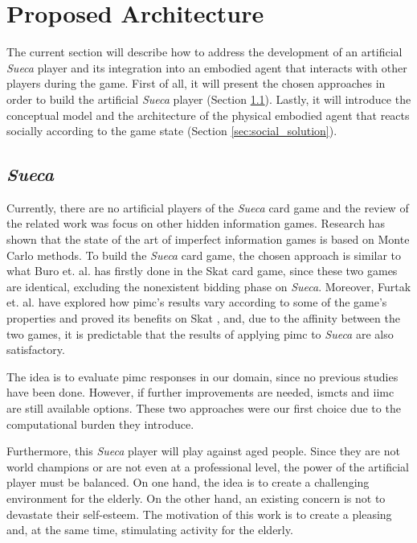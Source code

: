 \section{Proposed Architecture} \label{sec:architecture}

The current section will describe how to address the development of an artificial \emph{Sueca} player and its integration into an embodied agent that interacts with other players during the game.
First of all, it will present the chosen approaches in order to build the artificial \emph{Sueca} player (Section \ref{sec:sueca_solution}).
Lastly, it will introduce the conceptual model and the architecture of the physical embodied agent that reacts socially according to the game state (Section \ref{sec:social_solution}).


\subsection{\emph{Sueca}}
\label{sec:sueca_solution}

Currently, there are no artificial players of the \emph{Sueca} card game and the review of the related work was focus on other hidden information games.
Research has shown that the state of the art of imperfect information games is based on Monte Carlo methods.
To build the \emph{Sueca} card game, the chosen approach is similar to what Buro et. al. has firstly done in the Skat card game, since these two games are identical, excluding the nonexistent bidding phase on \emph{Sueca}.
Moreover, Furtak et. al. have explored how \gls{pimc}'s results vary according to some of the game's properties and proved its benefits on Skat \cite{Long2010}, and, due to the affinity between the two games, it is predictable that the results of applying \gls{pimc} to \emph{Sueca} are also satisfactory.


The idea is to evaluate \gls{pimc} responses in our domain, since no previous studies have been done.
However, if further improvements are needed, \gls{ismcts} and \gls{iimc} are still available options.
These two approaches were our first choice due to the computational burden they introduce.


Furthermore, this \emph{Sueca} player will play against aged people.
Since they are not world champions or are not even at a professional level, the power of the artificial player must be balanced.
On one hand, the idea is to create a challenging environment for the elderly.
On the other hand, an existing concern is not to devastate their self-esteem.
The motivation of this work is to create a pleasing and, at the same time, stimulating activity for the elderly.

